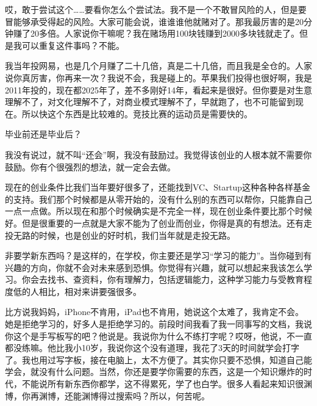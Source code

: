 
哎，敢于尝试这个……要看你怎么个尝试法。我不是一个不敢冒风险的人，但是要冒能够承受得起的风险。大家可能会说，谁谁谁他就赌对了。那我最厉害的是20分钟赚了20多倍。人家说你干嘛呢？我在赌场用100块钱赚到2000多块钱就走了。但是我可以重复这件事吗？不能。

我当年投网易，也是几个月赚了二十几倍，真是二十几倍，而且我是全仓的。人家说你真厉害，你再来一次？我说不会，我是碰上的。苹果我们投得也很好啊，我是2011年投的，现在都2025年了，差不多刚好14年，看起来是很好。但你要是对生意理解不了，对文化理解不了，对商业模式理解不了，早就跑了，也不可能留到现在。所以快这个东西是比较难的。竞技比赛的运动员是需要快的。



毕业前还是毕业后？


我没有说过，就不叫“还会”啊，我没有鼓励过。我觉得该创业的人根本就不需要你鼓励。你有个很强烈的想法，就一定会去做。

现在的创业条件比我们当年要好很多了，还能找到VC、Startup这种各种各样基金的支持。我们那个时候都是从零开始的，没有什么别的东西可以帮你，只能靠自己一点一点做。所以现在和那个时候确实是不完全一样，现在创业条件要比那个时候好。但是很重要的一点就是大家不能为了创业而创业，你得是真的有想法。还有走投无路的时候，也是创业的好时机，我们当年就是走投无路。



非要学新东西吗？是这样的，在学校，你主要还是学习“学习的能力”。当你碰到有兴趣的方向，你就不会对未来感到恐惧。你觉得有兴趣，就可以想起来我该怎么学习。你会去找书、查资料，你有理解力，包括逻辑能力，这种学习能力与受教育程度低的人相比，相对来讲要强很多。

比方说我妈妈，iPhone不肯用，iPad也不肯用，她说这个太难了，我肯定不会。她是拒绝学习的，好多人是拒绝学习的。前段时间我看了我一同事写的文档，我说你这个是手写板写的吧？他说是。我说你为什么不练打字呢？哎呀，他说，不一直都没练嘛。他比我小10岁，我说你这个没有道理，我花了3天的时间就学会打字了。我也用过写字板，接在电脑上，太不方便了。其实你只要不恐惧，知道自己能学会，就没有什么问题。当然，你还是要学你需要的东西，这是一个知识爆炸的时代，不能说所有新东西你都学，这不得累死，学了也白学。很多人看起来知识很渊博，你再渊博，还能渊博得过搜索吗？所以，何苦呢。

